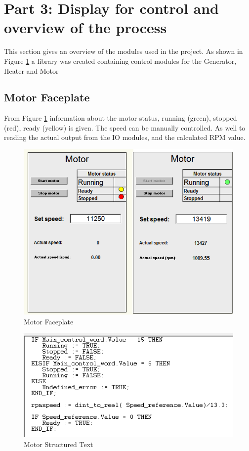 \section{Part 3: Display for control and overview of the process}

This section gives an overview of the modules used in the project. As shown in Figure \ref{motor_fp} a library was created containing control modules for the Generator, Heater and Motor 


\subsection{Motor Faceplate}
From Figure \ref{motor_fp} information about the motor status, running (green), stopped (red), ready (yellow) is given. The speed can be manually controlled. As well to reading the actual output from the IO modules, and the calculated RPM value.
\begin{figure}[!htb]
    \centering
    \includegraphics[scale=0.7]{images/Motor_Status}
    \caption{Motor Faceplate}
    \label{motor_fp}

\end{figure}

\begin{figure}[!htb]
    \includegraphics[scale=0.8]{images/motor_ST}
    \caption{Motor Structured Text}
    \label{motor_st}

\end{figure}

